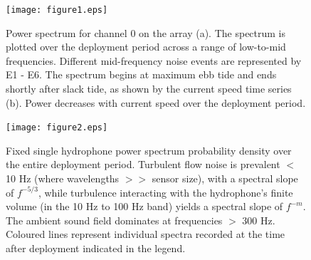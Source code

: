 \documentclass[12pt,journal,onecolumn]{IEEEtran}
\begin{document}
\begin{figure}[H]
	\begin{center}	
		\texttt{[image: figure1.eps]} 
	\end{center}
	\caption[Hydrophone power spectra]{
	\label{f:power}
Power spectrum for channel 0 on the array (a). The spectrum is plotted over the deployment period across a range of low-to-mid frequencies. Different mid-frequency noise events are represented by E1 - E6.  The spectrum begins at maximum ebb tide and ends shortly after slack tide, as shown by the current speed time series (b). Power decreases with current  speed over the deployment period. }
\end{figure}
\begin{figure}[H]
	\begin{center}
		\texttt{[image: figure2.eps]} 
	\end{center}
	\caption[Power spectrum probability density]{
	\label{f:lines}
	Fixed single hydrophone power spectrum probability density over the entire deployment period. Turbulent flow noise is prevalent $<$ 10 Hz (where wavelengths $>>$ sensor size), with a spectral slope of $f^{-5/3}$, while turbulence interacting with the hydrophone's finite volume (in the 10 Hz to 100 Hz band) yields a spectral slope of $f^{-m}$. The ambient sound field dominates at frequencies $>$ 300 Hz. Coloured lines represent individual spectra recorded at the time after deployment indicated in the legend.}
\end{figure}
\end{document}
